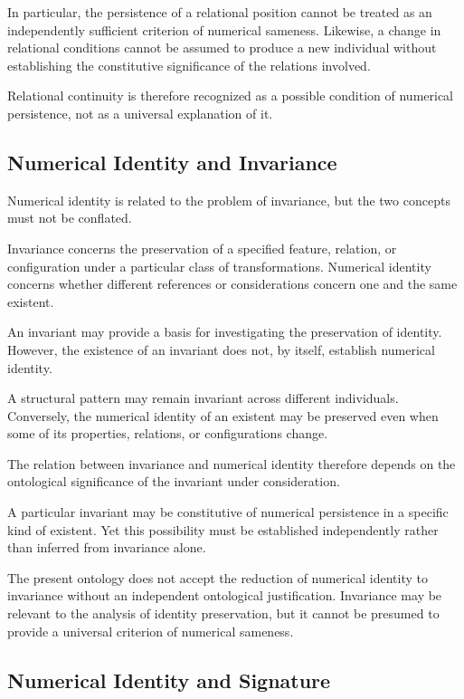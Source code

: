In particular, the persistence of a
relational position cannot be treated
as an independently sufficient criterion
of numerical sameness. Likewise, a change
in relational conditions cannot be
assumed to produce a new individual
without establishing the constitutive
significance of the relations involved.

Relational continuity is therefore
recognized as a possible condition
of numerical persistence, not as a
universal explanation of it.

\subsection{Numerical Identity and Invariance}

Numerical identity is related to the
problem of invariance, but the two
concepts must not be conflated.

Invariance concerns the preservation
of a specified feature, relation, or
configuration under a particular class
of transformations. Numerical identity
concerns whether different references
or considerations concern one and the
same existent.

An invariant may provide a basis for
investigating the preservation of identity.
However, the existence of an invariant
does not, by itself, establish numerical
identity.

A structural pattern may remain invariant
across different individuals. Conversely,
the numerical identity of an existent
may be preserved even when some of its
properties, relations, or configurations
change.

The relation between invariance and
numerical identity therefore depends
on the ontological significance of
the invariant under consideration.

A particular invariant may be constitutive
of numerical persistence in a specific
kind of existent. Yet this possibility
must be established independently
rather than inferred from invariance
alone.

The present ontology does not accept
the reduction of numerical identity
to invariance without an independent
ontological justification. Invariance
may be relevant to the analysis of
identity preservation, but it cannot
be presumed to provide a universal
criterion of numerical sameness.

\subsection{Numerical Identity and Signature}

